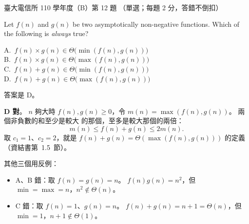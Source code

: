 \begin{pastexam}[label={px:ntu-110-comm-dsa-12}]{臺大電信所 110 學年度（B）第 12 題}
（單選；每題 2 分，答錯不倒扣）

Let $f(n)$ and $g(n)$ be two asymptotically non-negative functions. Which of the following is \textit{always} true?

A.~$f(n)\times g(n)\in\Theta\big(\min(f(n),g(n))\big)$\\
B.~$f(n)\times g(n)\in\Theta\big(\max(f(n),g(n))\big)$\\
C.~$f(n)+g(n)\in\Theta\big(\min(f(n),g(n))\big)$\\
D.~$f(n)+g(n)\in\Theta\big(\max(f(n),g(n))\big)$
\end{pastexam}

\begin{pastsoln}
答案是 D。

\textbf{D 對}。 $n$ 夠大時 $f(n), g(n) \ge 0$，令 $m(n) = \max(f(n), g(n))$。 兩個非負數的和至少是較大
的那個，至多是較大那個的兩倍：
\[
m(n) \le f(n) + g(n) \le 2m(n).
\]
取 $c_1 = 1$、$c_2 = 2$，就是 $f(n) + g(n) = \Theta(\max(f(n), g(n)))$ 的定義（資結書第~1.5~節）。

其他三個用反例：
\begin{itemize}
\item A、B 錯：取 $f(n) = g(n) = n$。 $f(n)g(n) = n^2$，但 $\min = \max = n$，$n^2 \notin \Theta(n)$。
\item C 錯：取 $f(n) = 1$、$g(n) = n$。 $f(n) + g(n) = n + 1 = \Theta(n)$，但 $\min = 1$，$n + 1 \notin \Theta(1)$。
\end{itemize}
\end{pastsoln}

